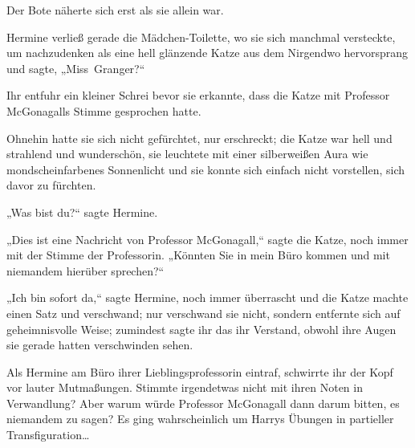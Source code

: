 
Der Bote näherte sich erst als sie allein war.

Hermine verließ gerade die Mädchen-Toilette, wo sie sich manchmal versteckte, um nachzudenken als eine hell glänzende Katze aus dem Nirgendwo hervorsprang und sagte, „Miss~Granger?“

Ihr entfuhr ein kleiner Schrei bevor sie erkannte, dass die Katze mit Professor McGonagalls Stimme gesprochen hatte.

Ohnehin hatte sie sich nicht gefürchtet, nur erschreckt; die Katze war hell und strahlend und wunderschön, sie leuchtete mit einer silberweißen Aura wie mondscheinfarbenes Sonnenlicht und sie konnte sich einfach nicht vorstellen, sich davor zu fürchten.

„Was bist du?“ sagte Hermine.

„Dies ist eine Nachricht von Professor McGonagall,“ sagte die Katze, noch immer mit der Stimme der Professorin. „Könnten Sie in mein Büro kommen und mit niemandem hierüber sprechen?“

„Ich bin sofort da,“ sagte Hermine, noch immer überrascht und die Katze machte einen Satz und verschwand; nur verschwand sie nicht, sondern entfernte sich auf geheimnisvolle Weise; zumindest sagte ihr das ihr Verstand, obwohl ihre Augen sie gerade hatten verschwinden sehen.

Als Hermine am Büro ihrer Lieblingsprofessorin eintraf, schwirrte ihr der Kopf vor lauter Mutmaßungen. Stimmte irgendetwas nicht mit ihren Noten in Verwandlung? Aber warum würde Professor McGonagall dann darum bitten, es niemandem zu sagen? Es ging wahrscheinlich um Harrys Übungen in partieller Transfiguration…

